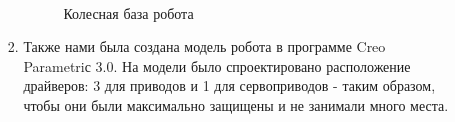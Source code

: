 \begin{enumerate}
\begin{enumerate}
\begin{enumerate}
			\begin{figure}[H]
				\begin{minipage}[h]{0.2\linewidth}
					\center  
				\end{minipage}
				\begin{minipage}[h]{0.6\linewidth}
					\caption{Колесная база робота}
				\end{minipage}
			\end{figure}
			
			\item Также нами была создана модель робота в программе Creo Parametriс 3.0. На модели было спроектировано расположение драйверов: 3 для приводов и 1 для сервоприводов - таким образом, чтобы они были максимально защищены и не занимали много места.
			

\end{enumerate}
\end{enumerate}
\end{enumerate}
